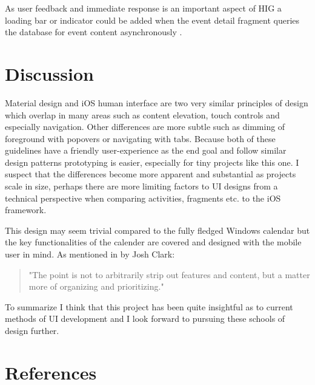 \documentclass[]{article}
\begin{document}
\begin{flushleft}
As user feedback and immediate response is an important aspect of HIG a loading bar or indicator could be added when the event detail fragment queries the database for event content asynchronously \parencite{progress}.


\left\section{Discussion}

Material design and iOS human interface are two very similar principles of design which overlap in many areas such as content elevation, touch controls and especially navigation. Other differences are more subtle such as dimming of foreground with popovers or navigating with tabs. Because both of these guidelines have a friendly user-experience as the end goal and follow similar design patterns prototyping is easier, especially for tiny projects like this one. I suspect that the differences become more apparent and substantial as projects scale in size, perhaps there are more limiting factors to UI designs from a technical perspective when comparing activities, fragments etc. to the iOS framework.\medskip

This design may seem trivial compared to the fully fledged Windows calendar but the key functionalities of the calender are covered and designed with the mobile user in mind. As mentioned in \cite{joshclark:1} by Josh Clark:

\begin{quote}
"The point is not to arbitrarily strip out features and content, but a matter more of organizing and prioritizing."
\end{quote}

To summarize I think that this project has been quite insightful as to current methods of UI development and I look forward to pursuing these schools of design further.
\newpage


\left\section{References}
\printbibliography[title={Online sources}]

\end{flushleft}
\end{document}
